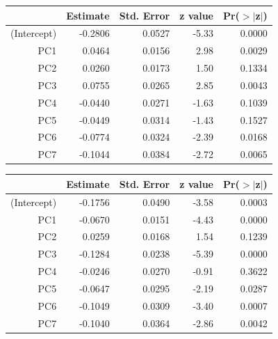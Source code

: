 \documentclass[a4paper,12pt]{Latex/Classes/PhDthesisPSnPDF}
\begin{document}
\begin{table}[ht]
\centering
\begin{tabular}{rrrrr}
  \hline
 & Estimate & Std. Error & z value & Pr($>$$|$z$|$) \\ 
  \hline
(Intercept) & -0.2806 & 0.0527 & -5.33 & 0.0000 \\ 
  PC1 & 0.0464 & 0.0156 & 2.98 & 0.0029 \\ 
  PC2 & 0.0260 & 0.0173 & 1.50 & 0.1334 \\ 
  PC3 & 0.0755 & 0.0265 & 2.85 & 0.0043 \\ 
  PC4 & -0.0440 & 0.0271 & -1.63 & 0.1039 \\ 
  PC5 & -0.0449 & 0.0314 & -1.43 & 0.1527 \\ 
  PC6 & -0.0774 & 0.0324 & -2.39 & 0.0168 \\ 
  PC7 & -0.1044 & 0.0384 & -2.72 & 0.0065 \\ 
   \hline
\end{tabular}
\end{table}
\begin{table}[ht]
\centering
\begin{tabular}{rrrrr}
  \hline
 & Estimate & Std. Error & z value & Pr($>$$|$z$|$) \\ 
  \hline
(Intercept) & -0.1756 & 0.0490 & -3.58 & 0.0003 \\ 
  PC1 & -0.0670 & 0.0151 & -4.43 & 0.0000 \\ 
  PC2 & 0.0259 & 0.0168 & 1.54 & 0.1239 \\ 
  PC3 & -0.1284 & 0.0238 & -5.39 & 0.0000 \\ 
  PC4 & -0.0246 & 0.0270 & -0.91 & 0.3622 \\ 
  PC5 & -0.0647 & 0.0295 & -2.19 & 0.0287 \\ 
  PC6 & -0.1049 & 0.0309 & -3.40 & 0.0007 \\ 
  PC7 & -0.1040 & 0.0364 & -2.86 & 0.0042 \\ 
   \hline
\end{tabular}
\end{table}
\end{document}
